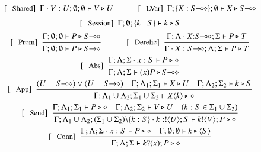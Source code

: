 \begin{figure}[!t]
\[
	\begin{array}{c}
		\trule{Shared}~~\Gamma \cat V:U; \emptyset; \emptyset \proves V \hastype U
		\qquad\quad
		\trule{LVar}~~\Gamma; \set{X: \lhot{S}}; \emptyset \proves X \hastype \lhot{S} 
		\\[2mm]

		\trule{Session}~~\Gamma; \emptyset; \set{k:S} \proves k \hastype S 
		\\[2mm]

		\trule{Prom}~~\tree{
			\Gamma; \emptyset; \emptyset \proves P \hastype \lhot{S}
		}{
			\Gamma; \emptyset; \emptyset \proves P \hastype \shot{S}
		} 
		\qquad\quad  
		\trule{Derelic}~~\tree{
			\Gamma; \Lambda \cat X{:}\lhot{S}; \Sigma \proves P \hastype T
		}{
			\Gamma \cat X:\shot{S}; \Lambda; \Sigma \proves P \hastype T
		} 
		\\[4mm]

		\trule{Abs}~~\tree{
			\Gamma; \Lambda; \Sigma \cat x: S \proves P \hastype \Proc
		}{
			\Gamma; \Lambda; \Sigma \proves \abs{x}{P} \hastype \lhot{S}
		}
		\\[4mm]

		\trule{App}~~\tree{(U = \lhot{S}) \lor (U = \shot{S}) \quad \Gamma; \Lambda_1; \Sigma_1 \proves X \hastype U  \quad \Gamma; \Lambda_2; \Sigma_2 \proves k \hastype S
		}{
			\Gamma; \Lambda_1 \cup \Lambda_2; \Sigma_1 \cup \Sigma_2 \proves \appl{X}{k} \hastype \Proc
		} 
		\\[4mm]

		\trule{Send}~~\tree{
			\Gamma; \Lambda_1; \Sigma_1 \proves P \hastype \Proc  \quad \Gamma; \Lambda_2; \Sigma_2 \vdash V \hastype U  \quad (k:S \in \Sigma_1 \cup \Sigma_2)
		}{
			\Gamma; \Lambda_1 \cup \Lambda_2; (\Sigma_1 \cup \Sigma_2)\backslash\set{k:S} \cat k:\btout{U} S \proves \bout{k}{V} P \hastype \Proc
		}

		\\[4mm]
		\trule{Conn}~~\tree{
			\Gamma; \Lambda; \Sigma \cat x:S \proves P \hastype \Proc  \quad \Gamma; \emptyset; \emptyset \proves k \hastype \chtype{S}
		}{
			\Gamma; \Lambda; \Sigma \proves \binp{k}{x} P \hastype \Proc
		}
		\\[4mm]


\end{array}\]
\end{figure}
